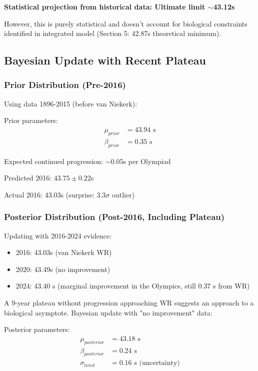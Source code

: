 \textbf{Statistical projection from historical data: Ultimate limit $\sim$43.12s}

However, this is purely statistical and doesn't account for biological constraints identified in integrated model (Section 5: 42.87s theoretical minimum).

\subsection{Bayesian Update with Recent Plateau}

\subsubsection{Prior Distribution (Pre-2016)}

Using data 1896-2015 (before van Niekerk):

Prior parameters:
\begin{align}
\mu_{prior} &= 43.94 \text{ s} \\
\beta_{prior} &= 0.35 \text{ s}
\end{align}

Expected continued progression: $\sim$0.05s per Olympiad

Predicted 2016: $43.75 \pm 0.22$s

Actual 2016: 43.03s (surprise: 3.3$\sigma$ outlier)

\subsubsection{Posterior Distribution (Post-2016, Including Plateau)}

Updating with 2016-2024 evidence:
\begin{itemize}
    \item 2016: 43.03s (van Niekerk WR)
    \item 2020: 43.49s (no improvement)
    \item 2024: 43.40 s (marginal improvement in the Olympics, still 0.37 s from WR)
\end{itemize}

A 9-year plateau without progression approaching WR suggests an approach to a biological asymptote. Bayesian update with "no improvement" data:

Posterior parameters:
\begin{align}
\mu_{posterior} &= 43.18 \text{ s} \\
\beta_{posterior} &= 0.24 \text{ s} \\
\sigma_{limit} &= 0.16 \text{ s (uncertainty)}
\end{align}

